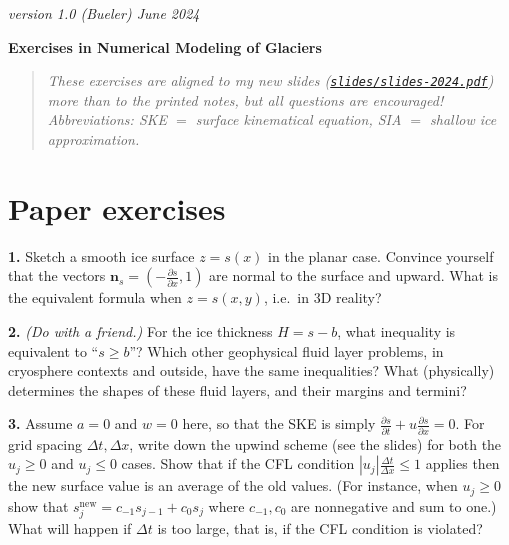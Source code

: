 \documentclass[12pt]{amsart}
\newcommand{\bn}{\mathbf{n}}
\newcommand{\prob}[1]{\bigskip\noindent\textbf{#1.}\quad }
\begin{document}
\scriptsize \hfill \emph{version 1.0 (Bueler) June 2024}
\normalsize\medskip

\large\centerline{\textbf{Exercises in Numerical Modeling of Glaciers}}
\medskip

\normalsize
\begin{quote}
\emph{These exercises are aligned to my new slides {\small \emph{(\href{https://github.com/bueler/mccarthy/blob/master/slides/slides-2024.pdf}{\texttt{slides/slides-2024.pdf}})} } more than to the printed notes, but all questions are encouraged!  Abbreviations: SKE $=$ surface kinematical equation, SIA $=$ shallow ice approximation.}
\end{quote}
\medskip
\thispagestyle{empty}

\section*{Paper exercises}

\vspace{-2mm}
\prob{1}  Sketch a smooth ice surface $z=s(x)$ in the planar case.  Convince yourself that the vectors $\bn_s = (-\frac{\partial s}{\partial x},1)$ are normal to the surface and upward.  What is the equivalent formula when $z=s(x,y)$, i.e.~in 3D reality?

\prob{2}  \emph{(Do with a friend.)}  For the ice thickness $H=s-b$, what inequality is equivalent to ``$s\ge b$''?   Which other geophysical fluid layer problems, in cryosphere contexts and outside, have the same inequalities?  What (physically) determines the shapes of these fluid layers, and their margins and termini?

\prob{3}  Assume $a=0$ and $w=0$ here, so that the SKE is simply $\frac{\partial s}{\partial t} + u \frac{\partial s}{\partial x} = 0$.  For grid spacing $\Delta t,\Delta x$, write down the upwind scheme (see the slides) for both the $u_j\ge 0$ and $u_j\le 0$ cases.  Show that if the CFL condition $|u_j| \frac{\Delta t}{\Delta x} \le 1$ applies then the new surface value is an average of the old values.  (For instance, when $u_j\ge 0$ show that $s_j^{\text{new}} = c_{-1} s_{j-1} + c_0 s_j$ where $c_{-1},c_0$ are nonnegative and sum to one.)  What will happen if $\Delta t$ is too large, that is, if the CFL condition is violated?
\end{document}
